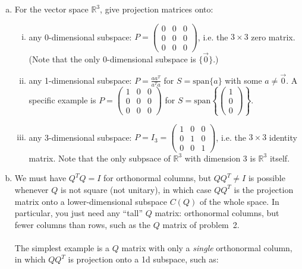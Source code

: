 \documentclass[12pt]{article}
\begin{document}
\begin{enumerate}[1.]
\begin{enumerate}[(a)]
        \item For the vector space $\mathbb{R}^3$, give projection matrices onto:
        \begin{enumerate}[(i)]
            \item any 0-dimensional subspace: $\boxed{P = \begin{pmatrix} 0 & 0 & 0\\ 0 & 0 & 0\\ 0 & 0 & 0\end{pmatrix}}$, i.e. the $3 \times 3$ zero matrix.
            (Note that the only 0-dimensional subspace is $\{\vec{0}\}$.)
            \item any 1-dimensional subspace: $\boxed{P = \frac{a a^T}{a^T a}}$ for $S = \text{span}\{a\}$ with some $a \ne \vec{0}$. A specific example is $\boxed{P = \begin{pmatrix} 1 & 0 & 0\\ 0 & 0 & 0\\ 0 & 0 & 0\end{pmatrix}}$ for $S = \text{span}\left\{\begin{pmatrix}
            1\\0\\0
            \end{pmatrix}\right\}$.
            \item any 3-dimensional subspace: $\boxed{P = I_3 = \begin{pmatrix} 1 & 0 & 0\\ 0 & 1 & 0\\ 0 & 0 & 1\end{pmatrix} }$, i.e. the $3 \times 3$ identity matrix. Note that the only subpsace of $\mathbb{R}^3$ with dimension 3 is $\mathbb{R}^3$ itself. %
        \end{enumerate}
        \item We must have $Q^T Q = I$ for orthonormal columns, but $\boxed{QQ^T \ne I}$ is possible whenever $Q$ is not square (not unitary), in which case $QQ^T$ is the projection matrix onto a lower-dimensional subspace $C(Q)$ of the whole space.   In particular, you just need any ``tall'' $Q$ matrix: orthonormal columns, but fewer columns than rows, such as the $Q$ matrix of problem~2.  \\
        \\
        The simplest example is a $Q$ matrix with only a \emph{single} orthonormal column, in which $QQ^T$ is projection onto a 1d subspace, such as:

\end{enumerate}
\end{enumerate}
\end{document}
